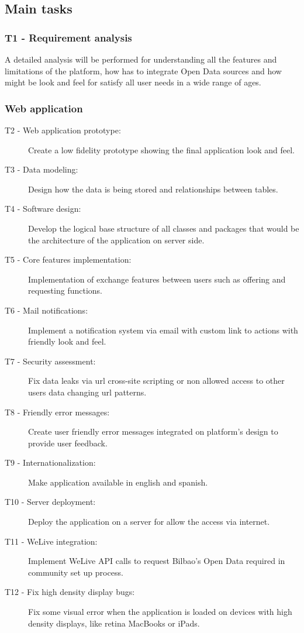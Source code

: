 \documentclass{DeustoFDP}
\begin{document}
\subsection{Main tasks}
\subsubsection{T1 - Requirement analysis}
A detailed analysis will be performed for understanding all the features and limitations of the platform, how has to integrate Open Data sources and how might be look and feel for satisfy all user needs in a wide range of ages.
\subsubsection{Web application}
\begin{description}
	\item[T2 - Web application prototype:] Create a low fidelity prototype showing the final application look and feel.
	\item[T3 - Data modeling:] Design how the data is being stored and relationships between tables. 
	\item[T4 - Software design:] Develop the logical base structure of all classes and packages that would be the architecture of the application on server side.
	\item[T5 - Core features implementation:] Implementation of exchange features between users such as offering and requesting functions.
	\item[T6 - Mail notifications:] Implement a notification system via email with custom link to actions with friendly look and feel.
	\item[T7 - Security assessment:] Fix data leaks via url cross-site scripting or non allowed access to other users data changing url patterns.
	\item[T8 - Friendly error messages:] Create user friendly error messages integrated on platform's design to provide user feedback.
	\item[T9 - Internationalization:] Make application available in english and spanish.
	\item[T10 - Server deployment:] Deploy the application on a server for allow the access via internet.
	\item[T11 - WeLive integration:] Implement WeLive API calls to request Bilbao's Open Data required in community set up process.
	\item[T12 - Fix high density display bugs:] Fix some visual error when the application is loaded on devices with high density displays, like retina MacBooks or iPads.
\end{description}
\end{document}
